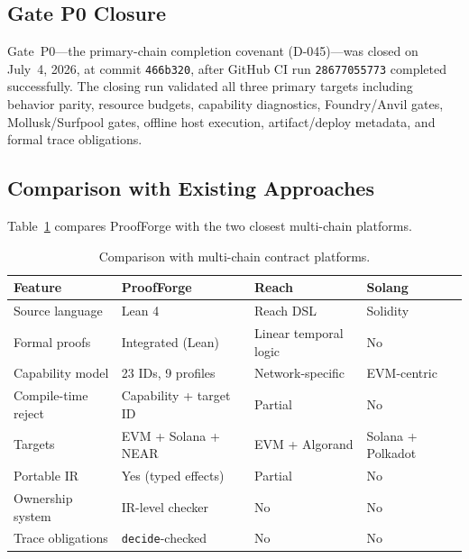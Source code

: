 \documentclass[sigconf]{acmart}
\newcommand{\ttab}{\scriptsize}
\begin{document}
\subsection{Gate P0 Closure}

Gate~P0---the primary-chain completion covenant (D-045)---was closed on July~4, 2026, at commit
\texttt{466b320}, after GitHub CI run \texttt{28677055773} completed successfully. The closing
run validated all three primary targets including behavior parity, resource budgets,
capability diagnostics, Foundry/Anvil gates, Mollusk/Surfpool gates, offline host execution,
artifact/deploy metadata, and formal trace obligations.

\subsection{Comparison with Existing Approaches}

Table~\ref{tab:compare} compares ProofForge with the two closest multi-chain platforms.

\begin{table}[t]
  \caption{Comparison with multi-chain contract platforms.}
  \label{tab:compare}
  \centering
  \ttab
  \begin{tabularx}{\textwidth}{l X X X}
    \toprule
    \bfseries Feature & \bfseries ProofForge & \bfseries Reach & \bfseries Solang \\
    \midrule
    Source language        & Lean 4 & Reach DSL & Solidity \\
    Formal proofs          & Integrated (Lean) & Linear temporal logic & No \\
    Capability model       & 23 IDs, 9 profiles & Network-specific & EVM-centric \\
    Compile-time reject    & Capability + target ID & Partial & No \\
    Targets                & EVM + Solana + NEAR & EVM + Algorand & Solana + Polkadot \\
    Portable IR            & Yes (typed effects) & Partial & No \\
    Ownership system       & IR-level checker & No & No \\
    Trace obligations      & \texttt{decide}-checked & No & No \\
    \bottomrule
  \end{tabularx}
\end{table}

\end{document}
